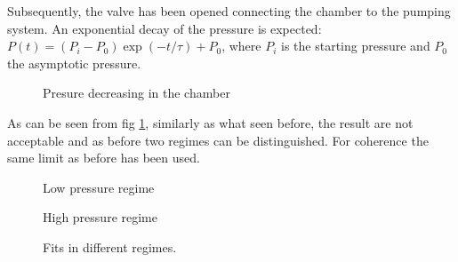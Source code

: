 \documentclass[11pt,a4 paper]{article}
\begin{document}
Subsequently, the valve has been opened connecting the chamber to the pumping system. An exponential decay of the pressure is expected: $P(t) = (P_i - P_0)\exp(-t/\tau) + P_0$, where $P_i$ is the starting pressure and $P_0$ the asymptotic pressure.

\begin{figure}[H]
  \centering
   \hspace{-0.05\textwidth}
  \caption{Presure decreasing in the chamber}
  \label{fig:decrease_all}
\end{figure}

As can be seen from fig \ref{fig:decrease_all}, similarly as what seen before, the result are not acceptable and as before two regimes can be distinguished. For coherence the same limit as before has been used.

\begin{figure}[H]
  \centering
   \hspace{-0.05\textwidth}
  \caption{Low pressure regime}
  \label{fig:decrease_lowP}
\end{figure}

\begin{figure}[H]
  \centering
   \hspace{-0.05\textwidth}
  \caption{High pressure regime}
  \label{fig:decrease_highP}
\end{figure}


\begin{figure}[H]
  \centering
  \caption{Fits in different regimes.}
  \label{fig:combined_emptying}
\end{figure}

\end{document}
